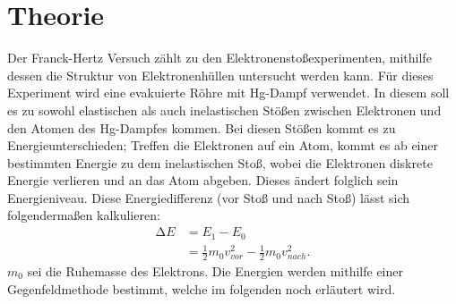 \section{Theorie}
\label{sec:Theorie}

Der Franck-Hertz Versuch zählt zu den Elektronenstoßexperimenten, mithilfe 
dessen die Struktur von Elektronenhüllen untersucht werden kann. Für dieses 
Experiment wird eine evakuierte Röhre mit Hg-Dampf verwendet. In diesem soll 
es zu sowohl elastischen als auch inelastischen Stößen zwischen Elektronen 
und den Atomen des Hg-Dampfes kommen. Bei diesen Stößen kommt es zu 
Energieunterschieden; Treffen die Elektronen auf ein Atom, kommt es ab einer 
bestimmten Energie zu dem inelastischen Stoß, wobei die Elektronen diskrete 
Energie verlieren und an das Atom abgeben. Dieses ändert folglich sein 
Energieniveau. Diese Energiedifferenz (vor Stoß und nach Stoß) lässt sich 
folgendermaßen kalkulieren:
\begin{align}
    \label{eqn:1}
    \increment E &= E_1 -E_0 \\
                 &= \frac{1}{2} m_0 v_{vor}^2 - \frac{1}{2} m_0 v_{nach}^2.
\end{align}
\noindent $m_0$ sei die Ruhemasse des Elektrons. Die Energien werden mithilfe 
einer Gegenfeldmethode bestimmt, welche im folgenden noch erläutert wird.

